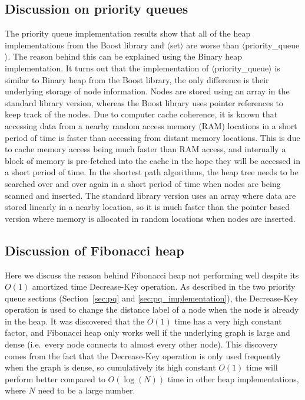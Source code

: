 \subsection{Discussion on priority queues}
The priority queue implementation results show that
all of the heap implementations from the Boost library and $\langle$set$\rangle$ are worse than $\langle$priority\_queue$\rangle$.
The reason behind this can be explained using the Binary heap implementation.
It turns out that the implementation of $\langle$priority\_queue$\rangle$ is similar to Binary heap from the Boost library,
the only difference is their underlying storage of node information.
Nodes are stored using an array in the standard library version,
whereas the Boost library uses pointer references to keep track of 
the nodes.
Due to computer cache coherence,
it is known that accessing data from a nearby random access memory (RAM) locations in a short period of time is faster than accessing from distant memory locations.
This is due to cache memory access being much faster than RAM access,
and internally a block of memory is pre-fetched into the cache in the hope they will be accessed in a short period of time.
In the shortest path algorithms,
the heap tree needs to be searched over and over again in a short period of time when nodes are being scanned and inserted.
The standard library version uses an array where data are stored linearly in a nearby location,
so it is much faster than the pointer based version where memory is allocated in random locations when nodes are inserted.

\subsection{Discussion of Fibonacci heap}
Here we discuss the reason behind Fibonacci heap not performing well despite its $O(1)$ amortized time Decrease-Key operation.
As described in the two priority queue sections (Section~\ref{sec:pq} and \ref{sec:pq_implementation}),
the Decrease-Key operation is used to change the distance label of a node when the node is already in the heap.
It was discovered that the $O(1)$ time has a very high constant factor,
and Fibonacci heap only works well if the underlying graph is large and dense (i.e.\ every node connects to almost every other node).
This discovery comes from the fact that 
the Decrease-Key operation is only used frequently when the graph is dense,
so cumulatively its high constant $O(1)$ time will perform better compared to $O(\log(N))$ time in other heap implementations, where $N$ need to be a large number.

